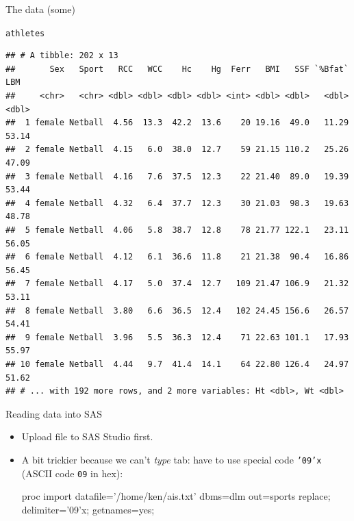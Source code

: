 \documentclass[unknownkeysallowed]{beamer}\usepackage[]{graphicx}\usepackage[]{color}
\makeatletter
\newcommand{\hlstd}[1]{\textcolor[rgb]{0.345,0.345,0.345}{#1}}%
\newenvironment{kframe}{%
 \def\at@end@of@kframe{}%
 \ifinner\ifhmode%
  \def\at@end@of@kframe{\end{minipage}}%
  \begin{minipage}{\columnwidth}%
 \fi\fi%
 \def\FrameCommand##1{\hskip\@totalleftmargin \hskip-\fboxsep
 \colorbox{shadecolor}{##1}\hskip-\fboxsep
     \hskip-\linewidth \hskip-\@totalleftmargin \hskip\columnwidth}%
 \MakeFramed {\advance\hsize-\width
   \@totalleftmargin\z@ \linewidth\hsize
   \@setminipage}}%
 {\par\unskip\endMakeFramed%
 \at@end@of@kframe}
\newenvironment{knitrout}{}{} %
\makeatother
\begin{document}
\begin{frame}[fragile]{The data (some)}
  
\begin{knitrout}\footnotesize
{}\color{fgcolor}\begin{kframe}
\begin{alltt}
\hlstd{athletes}
\end{alltt}
\begin{verbatim}
## # A tibble: 202 x 13
##       Sex   Sport   RCC   WCC    Hc    Hg  Ferr   BMI   SSF `%Bfat`   LBM
##     <chr>   <chr> <dbl> <dbl> <dbl> <dbl> <int> <dbl> <dbl>   <dbl> <dbl>
##  1 female Netball  4.56  13.3  42.2  13.6    20 19.16  49.0   11.29 53.14
##  2 female Netball  4.15   6.0  38.0  12.7    59 21.15 110.2   25.26 47.09
##  3 female Netball  4.16   7.6  37.5  12.3    22 21.40  89.0   19.39 53.44
##  4 female Netball  4.32   6.4  37.7  12.3    30 21.03  98.3   19.63 48.78
##  5 female Netball  4.06   5.8  38.7  12.8    78 21.77 122.1   23.11 56.05
##  6 female Netball  4.12   6.1  36.6  11.8    21 21.38  90.4   16.86 56.45
##  7 female Netball  4.17   5.0  37.4  12.7   109 21.47 106.9   21.32 53.11
##  8 female Netball  3.80   6.6  36.5  12.4   102 24.45 156.6   26.57 54.41
##  9 female Netball  3.96   5.5  36.3  12.4    71 22.63 101.1   17.93 55.97
## 10 female Netball  4.44   9.7  41.4  14.1    64 22.80 126.4   24.97 51.62
## # ... with 192 more rows, and 2 more variables: Ht <dbl>, Wt <dbl>
\end{verbatim}
\end{kframe}
\end{knitrout}
  
\end{frame}

\begin{frame}[fragile]{Reading data into SAS}
  
  \begin{itemize}
    \item Upload file to SAS Studio first.
  \item A bit trickier because we can't \emph{type} tab: have to use
    special code \texttt{'09'x} (ASCII code \texttt{09} in hex):
    
    \begin{Datastep}
proc import 
  datafile='/home/ken/ais.txt'
  dbms=dlm
  out=sports
  replace;
  delimiter='09'x;
  getnames=yes;

    \end{Datastep}
  \end{itemize}
  
\end{frame}
\end{document}
